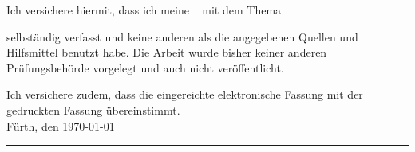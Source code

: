 Ich versichere hiermit, dass ich meine \arbeit~ mit dem Thema
\begin{quote}
\textit{\titel} \textit{\untertitel }
\end{quote}
selbständig verfasst und keine anderen als die angegebenen Quellen und Hilfsmittel benutzt habe. Die Arbeit wurde bisher keiner anderen Prüfungsbehörde vorgelegt und auch nicht veröffentlicht.


Ich versichere zudem, dass die eingereichte elektronische Fassung mit der gedruckten Fassung übereinstimmt.\\[10ex]

Fürth, den \today \\[4ex]


\rule[-0.2cm]{5cm}{0.5pt} \\

\textsc{\autor} \\[10ex]
